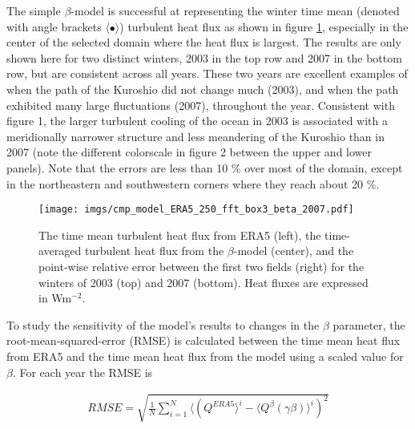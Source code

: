 The simple $\beta$-model is successful at representing the winter time mean (denoted with angle brackets $\langle\bullet\rangle$) turbulent heat flux as shown in figure \ref{fig:cmp_ERA5_beta_2003_2007}, especially in the center of the selected domain where the heat flux is largest. The results are only shown here for two distinct winters, 2003 in the top row and 2007 in the bottom row, but are consistent across all years. These two years are excellent examples of when the path of the Kuroshio did not change much (2003), and when the path exhibited many large fluctuations (2007), throughout the year. Consistent with figure 1, the larger turbulent cooling of the ocean in 2003 is associated with a meridionally narrower structure and less meandering of the Kuroshio than in 2007 (note the different colorscale in figure 2 between the upper and lower panels). Note that the errors are less than 10 \% over most of the domain, except in the northeastern and southwestern corners where they reach about 20 \%. \par 

\begin{figure}[tb]
    \centering
    \texttt{[image: imgs/cmp\_model\_ERA5\_250\_fft\_box3\_beta\_2007.pdf]}
    \caption{The time mean turbulent heat flux from ERA5 (left), the time-averaged turbulent heat flux from the $\beta$-model (center), and the point-wise relative error between the first two fields (right) for the winters of 2003 (top) and 2007 (bottom). Heat fluxes are expressed in Wm$^{-2}$. \label{fig:cmp_ERA5_beta_2003_2007} }
\end{figure}


To study the sensitivity of the model's results to changes in the $\beta$ parameter, the root-mean-squared-error (RMSE) is calculated between the time mean heat flux from ERA5 and the time mean heat flux from the model using a scaled value for $\beta$. For each year the RMSE is

\begin{align}
    RMSE = \sqrt{\frac{1}{N}\sum_{i=1}^N\langle\left(Q^{ERA5}\rangle^i-\langle Q^\beta(\gamma\beta) \rangle^i\right)^2 }
\end{align}

